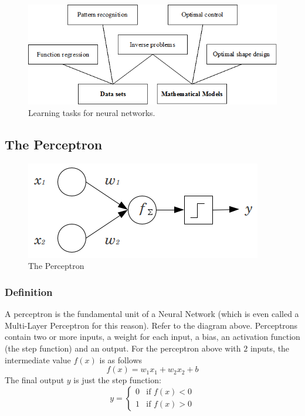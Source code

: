\begin{figure}[h!]
	\begin{center}
		\includegraphics[width=1.0\textwidth]{neural_networks_basis/learning_tasks}
		\caption{Learning tasks for neural networks.}\label{LearningTasksFigure}
	\end{center}
\end{figure}



\subsection{The Perceptron}
\begin{figure}[H]
	\centering
	\includegraphics[scale=0.5]{images/2MVdW}
	\caption{The Perceptron}
	\label{f:perceptron}
\end{figure}
\subsubsection{Definition}

A perceptron is the fundamental unit of a Neural Network (which is even called a Multi-Layer Perceptron for this reason). Refer to the diagram above. Perceptrons contain two or more inputs, a weight for each input, a bias, an activation function (the step function) and an output.
For the perceptron above with $2$ inputs, the intermediate value $f(x)$ is as follows
\[f(x) = w_1x_1 + w_2x_2 + b\]
The final output $y$ is just the step function:
\[
y =
\begin{cases}
0 & \text{if $f(x) < 0$} \\
1 & \text{if $f(x) > 0$}
\end{cases}
\]
